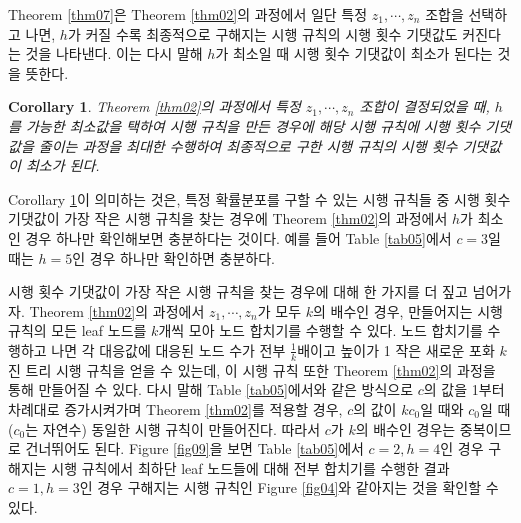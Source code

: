 \documentclass[11pt]{article}
\newtheorem{corollary}{Corollary}[theorem]
\begin{document}
Theorem \ref{thm07}은 Theorem \ref{thm02}의 과정에서 일단 특정 $z_{1}, \cdots, z_{n}$ 조합을 선택하고 나면, $h$가 커질 수록 최종적으로 구해지는 시행 규칙의 시행 횟수 기댓값도 커진다는 것을 나타낸다. 이는 다시 말해 $h$가 최소일 때 시행 횟수 기댓값이 최소가 된다는 것을 뜻한다.

\singlespacing
\begin{corollary}
Theorem \ref{thm02}의 과정에서 특정 $z_{1}, \cdots, z_{n}$ 조합이 결정되었을 때, $h$를 가능한 최소값을 택하여 시행 규칙을 만든 경우에 해당 시행 규칙에 시행 횟수 기댓값을 줄이는 과정을 최대한 수행하여 최종적으로 구한 시행 규칙의 시행 횟수 기댓값이 최소가 된다.
\label{cor0701}
\end{corollary}
\doublespacing

Corollary \ref{cor0701}이 의미하는 것은, 특정 확률분포를 구할 수 있는 시행 규칙들 중 시행 횟수 기댓값이 가장 작은 시행 규칙을 찾는 경우에 Theorem \ref{thm02}의 과정에서 $h$가 최소인 경우 하나만 확인해보면 충분하다는 것이다. 예를 들어 Table \ref{tab05}에서 $c=3$일 때는 $h=5$인 경우 하나만 확인하면 충분하다.

시행 횟수 기댓값이 가장 작은 시행 규칙을 찾는 경우에 대해 한 가지를 더 짚고 넘어가자. Theorem \ref{thm02}의 과정에서 $z_{1}, \cdots, z_{n}$가 모두 $k$의 배수인 경우, 만들어지는 시행 규칙의 모든 leaf 노드를 $k$개씩 모아 노드 합치기를 수행할 수 있다. 노드 합치기를 수행하고 나면 각 대응값에 대응된 노드 수가 전부 $\displaystyle \frac{1}{k}$배이고 높이가 1 작은 새로운 포화 $k$진 트리 시행 규칙을 얻을 수 있는데, 이 시행 규칙 또한 Theorem \ref{thm02}의 과정을 통해 만들어질 수 있다. 다시 말해 Table \ref{tab05}에서와 같은 방식으로 $c$의 값을 1부터 차례대로 증가시켜가며 Theorem \ref{thm02}를 적용할 경우, $c$의 값이 $kc_{0}$일 때와 $c_{0}$일 때 ($c_{0}$는 자연수) 동일한 시행 규칙이 만들어진다. 따라서 $c$가 $k$의 배수인 경우는 중복이므로 건너뛰어도 된다. Figure \ref{fig09}을 보면 Table \ref{tab05}에서 $c=2, h=4$인 경우 구해지는 시행 규칙에서 최하단 leaf 노드들에 대해 전부 합치기를 수행한 결과 $c=1, h=3$인 경우 구해지는 시행 규칙인 Figure \ref{fig04}와 같아지는 것을 확인할 수 있다.\\
\end{document}
